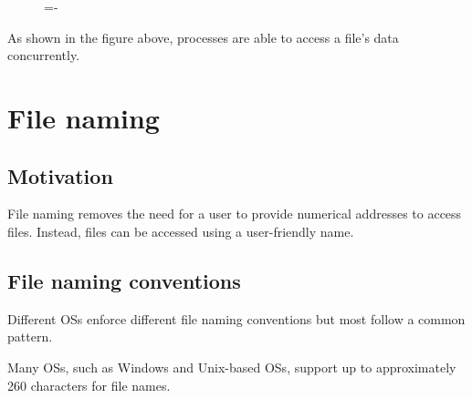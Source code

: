 \documentclass[a4paper]{systems-software}
\begin{document}
\begin{figure}[H]
  \lineskip=-\fboxrule
\end{figure}

As shown in the figure above, processes are able to access a file's data concurrently.


\section*{File naming}

\subsection*{Motivation}

File naming removes the need for a user to provide numerical addresses to access files. Instead, files can be accessed using a user-friendly name.


\subsection*{File naming conventions}

Different OSs enforce different file naming conventions but most follow a common pattern.

Many OSs, such as Windows and Unix-based OSs, support up to approximately 260 characters for file names.
\end{document}
